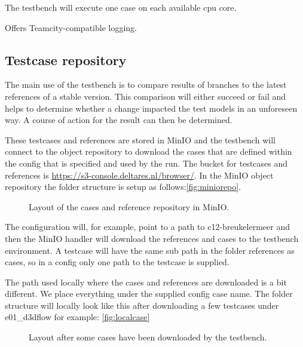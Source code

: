 \documentclass{deltares_memo}
\begin{document}
\begin{guilist}
\item[\texttt{-{}-parallel}] The testbench will execute one case on each available cpu core.

\item[\texttt{-{}-teamcity}] Offers Teamcity-compatible logging.
\end{guilist}

\subsection{Testcase repository}
The main use of the testbench is to compare results of branches to the latest references of a stable version. This comparison will either succeed or fail and helps to determine whether a change impacted the test models in an unforeseen way. A course of action for the result can then be determined.

These testcases and references are stored in MinIO and the testbench will connect to the object repository to download the cases that are defined within the config that is specified and used by the run. The bucket for testcases and references is \url{https://s3-console.deltares.nl/browser/}.
In the MinIO object repository the folder structure is setup as follows:\autoref{fig:miniorepo}.
\begin{figure}[H]
\begin{minipage}[t]{0.45\textwidth}
\end{minipage}
\caption{Layout of the cases and reference repository in MinIO.}
\label{fig:miniorepo}
\end{figure}
The configuration will, for example, point to a path to c12-breukelermeer and then the MinIO handler will download the references and cases to the testbench environment. A testcase will have the same sub path in the folder references as cases, so in a config only one path to the testcase is supplied.

The path used locally where the cases and references are downloaded is a bit different. We place everything under the supplied config case name. The folder structure will locally look like this after downloading a few testcases under e01\_d3dflow for example: \autoref{fig:localcase}
\begin{figure}[H]
\begin{minipage}[t]{0.45\textwidth}
\end{minipage}
\caption{Layout after some cases have been downloaded by the testbench.}
\label{fig:localcase}
\end{figure}
\end{document}

